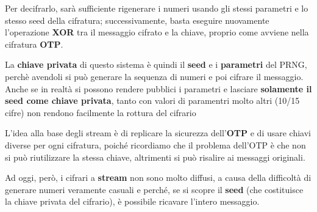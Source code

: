 \documentclass{report}
\begin{document}
Per decifrarlo, sarà sufficiente rigenerare i numeri usando gli stessi parametri e lo stesso seed della cifratura; successivamente, basta eseguire nuovamente l'operazione \textbf{XOR} tra il messaggio cifrato e la chiave, proprio come avviene nella cifratura \textbf{OTP}.

La \textbf{chiave privata} di questo sistema è quindi il \textbf{seed} e i \textbf{parametri} del PRNG, perchè avendoli si può generare la sequenza di numeri e poi cifrare il messaggio. Anche se in realtà si possono rendere pubblici i parametri e lasciare \textbf{solamente il seed come chiave privata}, tanto con valori di paramentri molto altri (10/15 cifre) non rendono facilmente la rottura del cifrario


L'idea alla base degli stream è di replicare la sicurezza dell'\textbf{OTP} e di usare chiavi diverse per ogni cifratura, poiché ricordiamo che il problema dell'OTP è che non si può riutilizzare la stessa chiave, altrimenti si può risalire ai messaggi originali.


Ad oggi, però, i cifrari a \textbf{stream} non sono molto diffusi, a causa della difficoltà di generare numeri veramente casuali e perché, se si scopre il \textbf{seed} (che costituisce la chiave privata del cifrario), è possibile ricavare l'intero messaggio.
\end{document}
